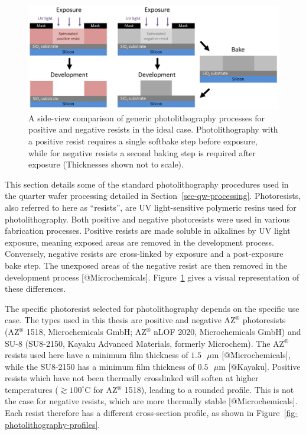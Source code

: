 \documentclass[
  letterpaper,
  DIV=11,
  numbers=noendperiod]{scrartcl}
\begin{document}
\begin{figure}

{\centering \includegraphics{figures/ch4/positive-negative-photolithography.png}

}

\caption{\label{fig-photolithography-types}A side-view comparison of
generic photolithography processes for positive and negative resists in
the ideal case. Photolithography with a positive resist requires a
single softbake step before exposure, while for negative resists a
second baking step is required after exposure (Thicknesses shown not to
scale).}

\end{figure}

This section details some of the standard photolithography procedures
used in the quarter wafer processing detailed in
Section~\ref{sec-qw-processing}. Photoresists, also referred to here as
``resists'', are UV light-sensitive polymeric resins used for
photolithography. Both positive and negative photoresists were used in
various fabrication processes. Positive resists are made soluble in
alkalines by UV light exposure, meaning exposed areas are removed in the
development process. Conversely, negative resists are cross-linked by
exposure and a post-exposure bake step. The unexposed areas of the
negative resist are then removed in the development process
{[}@Microchemicals{]}. Figure~\ref{fig-photolithography-types} gives a
visual representation of these differences.

The specific photoresist selected for photolithography depends on the
specific use case. The types used in this thesis are positive and
negative AZ\(^\circledR\) photoresists (AZ\(^\circledR\) 1518,
Microchemicals GmbH; AZ\(^\circledR\) nLOF 2020, Microchemicals GmbH)
and SU-8 (SU8-2150, Kayaku Advanced Materials, formerly Microchem). The
AZ\(^\circledR\) resists used here have a minimum film thickness of
\(1.5\textrm{ } \mu \textrm{m}\) {[}@Microchemicals{]}, while the
SU8-2150 has a minimum film thickness of
\(0.5\textrm{ } \mu \textrm{m}\) {[}@Kayaku{]}. Positive resists which
have not been thermally crosslinked will soften at higher temperatures
(\(\gtrsim 100^\circ\)C for AZ\(^\circledR\) 1518), leading to a rounded
profile. This is not the case for negative resists, which are more
thermally stable {[}@Microchemicals{]}. Each resist therefore has a
different cross-section profile, as shown in
Figure~\ref{fig-photolithography-profiles}.
\end{document}
